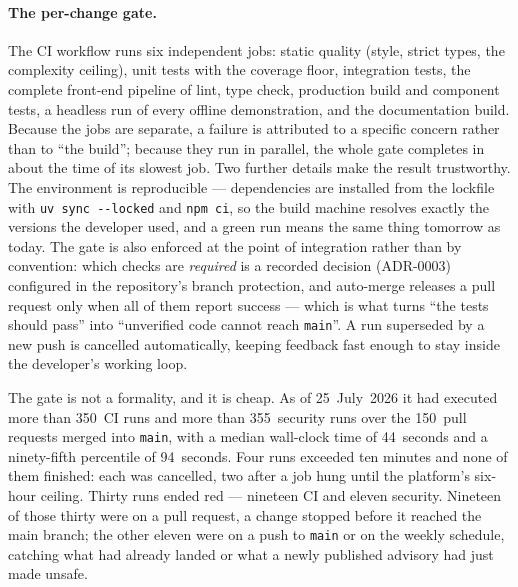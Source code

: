 \paragraph{The per-change gate.} The CI workflow runs six independent jobs: static
quality (style, strict types, the complexity ceiling), unit tests with the coverage
floor, integration tests, the complete front-end pipeline of lint, type check,
production build and component tests, a headless run of every offline demonstration,
and the documentation build. Because the jobs are separate, a failure is
attributed to a specific concern rather than to ``the build''; because they run in
parallel, the whole gate completes in about the time of its slowest job. Two further
details make the result trustworthy. The environment is reproducible --- dependencies
are installed from the lockfile with \texttt{uv sync -{}-locked} and \texttt{npm ci},
so the build machine resolves exactly the versions the developer used, and a green run
means the same thing tomorrow as today. The gate is also enforced at the point of
integration rather than by convention: which checks are \emph{required} is a recorded
decision (ADR-0003) configured in the repository's branch protection, and auto-merge
releases a pull request only when all of them report success --- which is what turns
``the tests should pass'' into ``unverified code cannot reach \texttt{main}''. A run
superseded by a new push is cancelled automatically, keeping feedback fast enough to
stay inside the developer's working loop.

The gate is not a formality, and it is cheap. As of 25~July~2026 it had executed more
than 350~CI runs and more than 355~security runs over the 150~pull requests merged into
\texttt{main}, with a median wall-clock time of 44~seconds and a ninety-fifth
percentile of 94~seconds. Four runs exceeded ten minutes and none of them finished:
each was cancelled, two after a job hung until the platform's six-hour ceiling.
Thirty runs ended red --- nineteen CI and eleven security. Nineteen of those thirty
were on a pull request, a change stopped before it reached the main branch; the other
eleven were on a push to \texttt{main} or on the weekly schedule, catching what had
already landed or what a newly published advisory had just made unsafe.

